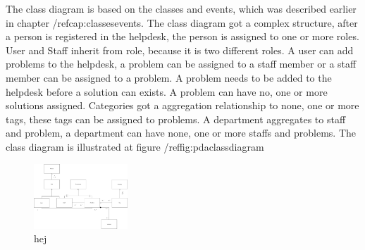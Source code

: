 The class diagram is based on the classes and events, which was described earlier in chapter /ref{cap:classesevents}. The class diagram got a complex structure, after a person is registered in the helpdesk, the person is assigned to one or more roles. User and Staff inherit from role, because it is two different roles. A user can add problems to the helpdesk, a problem can be assigned to a staff member or a staff member can be assigned to a problem. A problem needs to be added to the helpdesk before a solution can exists. A problem can have no, one or more solutions assigned. Categories got a aggregation relationship to none, one or more tags, these tags can be assigned to problems. A department aggregates to staff and problem, a department can have none, one or more staffs and problems.  The class diagram is illustrated at figure /ref{fig:pdaclassdiagram}

\begin{figure}
\includegraphics[width=100pt]{input/problem_domain_analysis/Klasse_diagram.jpg}
\caption{hej}
\label{pdaclassdiagram}
\end{figure}